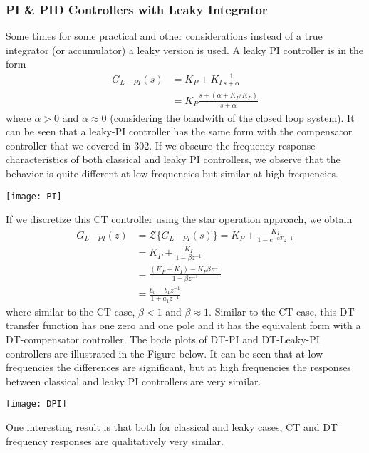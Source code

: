 \documentclass[twoside]{article}
\begin{document}
\subsubsection*{PI \& PID Controllers with Leaky Integrator}
%
Some times for some practical and other considerations
instead of a true integrator (or accumulator) a leaky version 
is used. A leaky PI controller is in the form
%
\begin{align*}
  G_{L-PI}(s) &= K_P + K_I \frac{1}{s + \alpha} \\
  &= K_P \frac{s + ( \alpha + K_I / K_P) }{s + \alpha}
\end{align*}
%
where $\alpha > 0$ and $\alpha \approx 0$ (considering the bandwith 
of the closed loop system). It can be seen that a leaky-PI controller
has the same form with the compensator controller that we covered in 
302. If we obscure the frequency response characteristics of both
classical and leaky PI controllers, we observe that the behavior is
quite different at low frequencies but similar at high frequencies.
%
    \begin{center}
\begin{minipage}[h]{0.6\linewidth}
    \begin{center}
      \texttt{[image: PI]}
    \end{center}
\end{minipage}
    \end{center}
%
If we discretize this CT controller
using the star operation approach, we obtain
%
\begin{align*}
  G_{L-PI}(z) &= \mathcal{Z} \lbrace G_{L-PI}(s) \rbrace  = K_P + 
  \frac{K_I}{1 - e^{-\alpha T} z^{-1}} \\
  &= K_P  + \frac{K_I}{1 - \beta z^{-1}} 
  \\
  &= \frac{(K_P  + K_I) - K_P \beta z^{-1} }{1 - \beta z^{-1}} 
  \\
 &= \frac{ b_0 + b_1 z^{-1}}{1 + a_1 z^{-1}} 
\end{align*}
%
where similar to the CT case, $\beta < 1$ and $\beta \approx 1$.
Similar to the CT case, this DT transfer function has one zero and
one pole and it has the equivalent form with a DT-compensator 
controller. The bode plots of DT-PI and DT-Leaky-PI controllers
are illustrated in the Figure below. It can be seen that
at low frequencies the differences are significant,
but at high frequencies the responses between classical
and leaky PI controllers are very similar.
%
    \begin{center}
\begin{minipage}[h]{0.6\linewidth}
    \begin{center}
      \texttt{[image: DPI]}
    \end{center}
\end{minipage}
    \end{center}
%
One interesting result is that both for classical and leaky
cases, CT and DT frequency responses are qualitatively very 
similar. 

\end{document}
